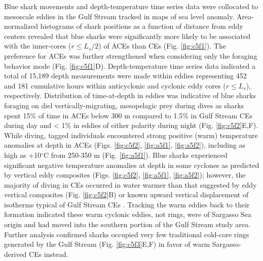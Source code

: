 Blue shark movements and depth-temperature time series data were collocated to mesoscale eddies in the Gulf Stream tracked in maps of sea level anomaly. Area-normalized histograms of shark positions as a function of distance from eddy centers revealed that blue sharks were significantly more likely to be associated with the inner-cores ($r \leq L_s / 2$) of ACEs than CEs (Fig. \ref{fig:c5f1}). The preference for ACEs was further strengthened when considering only the foraging behavior mode (Fig. \ref{fig:c5f1}D). Depth-temperature time series data indicated a total of 15,189 depth measurements were made within eddies representing 452 and 181 cumulative hours within anticyclonic and cyclonic eddy cores ($r \leq L_s$), respectively. Distribution of time-at-depth in eddies was indicative of blue sharks foraging on diel vertically-migrating, mesopelagic prey during dives as sharks spent 15\% of time in ACEs below 300 m compared to 1.5\% in Gulf Stream CEs during day and < 1\% in eddies of either polarity during night (Fig. \ref{fig:c5f2}E,F). While diving, tagged individuals encountered strong positive (warm) temperature anomalies at depth in ACEs (Figs. \ref{fig:c5f2}, \ref{fig:a5f1}, \ref{fig:a5f2}), including as high as +10$^\circ$C from 250-350 m (Fig. \ref{fig:a5f1}). Blue sharks experienced significant negative temperature anomalies at depth in some cyclones as predicted by vertical eddy composites (Figs. \ref{fig:c5f2}, \ref{fig:a5f1}, \ref{fig:a5f2}); however, the majority of diving in CEs occurred in water warmer than that suggested by eddy vertical composites (Fig. \ref{fig:c5f2}B) or known upward vertical displacement of isotherms typical of Gulf Stream CEs \citep[cold-core rings;][]{Gaube2014, Gaube2018}. Tracking the warm eddies back to their formation indicated these warm cyclonic eddies, not rings, were of Sargasso Sea origin and had moved into the southern portion of the Gulf Stream study area. Further analysis confirmed sharks occupied very few traditional cold-core rings generated by the Gulf Stream (Fig. \ref{fig:c5f3}E,F) in favor of warm Sargasso-derived CEs instead.

\clearpage

